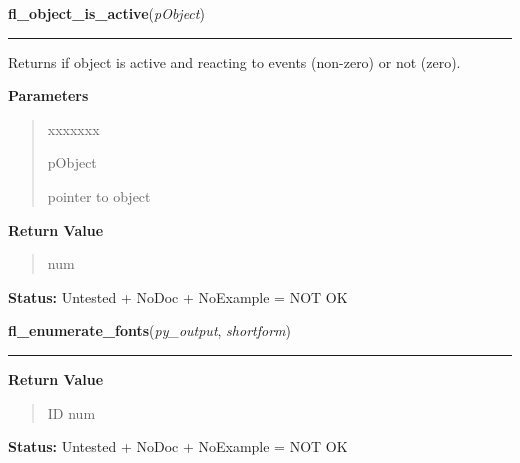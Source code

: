 \hspace{.8\funcindent}\begin{boxedminipage}{\funcwidth}

    \raggedright \textbf{fl\_object\_is\_active}(\textit{pObject})

    \vspace{-1.5ex}

    \rule{\textwidth}{0.5\fboxrule}
\setlength{\parskip}{2ex}
    Returns if object is active and reacting to events (non-zero) or not 
    (zero).

\setlength{\parskip}{1ex}
      \textbf{Parameters}
      \vspace{-1ex}

      \begin{quote}
        \begin{Ventry}{xxxxxxx}

          \item[pObject]

          pointer to object

        \end{Ventry}

      \end{quote}

      \textbf{Return Value}
    \vspace{-1ex}

      \begin{quote}
      num

      \end{quote}

\textbf{Status:} Untested + NoDoc + NoExample = NOT OK



    \end{boxedminipage}

    \label{xformslib:library:fl_enumerate_fonts}

    \vspace{0.5ex}

\hspace{.8\funcindent}\begin{boxedminipage}{\funcwidth}

    \raggedright \textbf{fl\_enumerate\_fonts}(\textit{py\_output}, \textit{shortform})

    \vspace{-1.5ex}

    \rule{\textwidth}{0.5\fboxrule}
\setlength{\parskip}{2ex}
\setlength{\parskip}{1ex}
      \textbf{Return Value}
    \vspace{-1ex}

      \begin{quote}
      ID num

      \end{quote}

\textbf{Status:} Untested + NoDoc + NoExample = NOT OK



    \end{boxedminipage}

